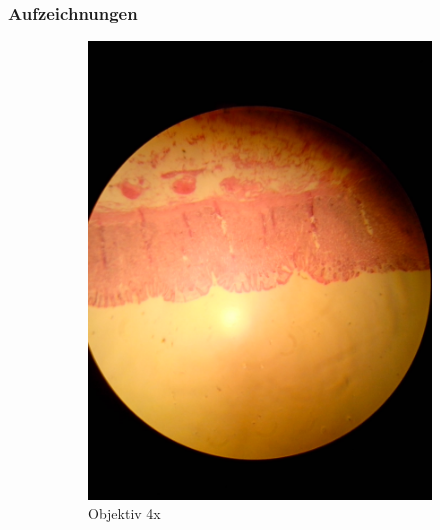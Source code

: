 \subsubsection{Aufzeichnungen}
\begin{figure}[h!]
	\centering
	\begin{subfigure}[b]{0.3\textwidth}
		\includegraphics[width=1\textwidth]{../images/01_stomach.jpg}
		\caption{Objektiv 4x}
	\end{subfigure}
	\begin{subfigure}[b]{0.3\textwidth}

\end{subfigure}
\end{figure}

